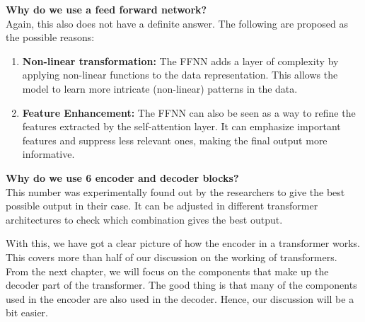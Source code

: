 \textbf{Why do we use a feed forward network?}\\
Again, this also does not have a definite answer. The following are proposed as the possible reasons:
\begin{enumerate}
    \item \textbf{Non-linear transformation:} The FFNN adds a layer of complexity by applying non-linear functions to the data representation. This allows the model to learn more intricate (non-linear) patterns in the data.

    \item \textbf{Feature Enhancement:} The FFNN can also be seen as a way to refine the features extracted by the self-attention layer. It can emphasize important features and suppress less relevant ones, making the final output more informative.
\end{enumerate}

\textbf{Why do we use 6 encoder and decoder blocks?}\\
This number was experimentally found out by the researchers to give the best possible output in their case. It can be adjusted in different transformer architectures to check which combination gives the best output.


With this, we have got a clear picture of how the encoder in a transformer works. This covers more than half of our discussion on the working of transformers. From the next chapter, we will focus on the components that make up the decoder part of the transformer. The good thing is that many of the components used in the encoder are also used in the decoder. Hence, our discussion will be a bit easier.